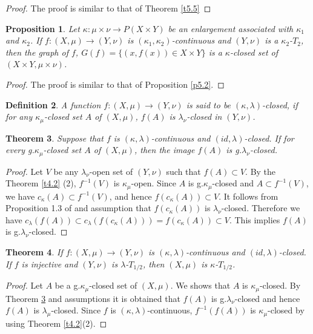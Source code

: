 \documentclass{matua}
\newtheorem{theorem}{Theorem}[section]
\newtheorem{definition}[theorem]{Definition}
\newtheorem{proposition}[theorem]{Proposition}
\begin{document}
\begin{proof}
The proof is similar to that of Theorem \ref{t5.5}
\end{proof}
\begin{proposition}
Let $\kappa:\mu\times \nu\rightarrow P(X\times Y)$ be an enlargement associated with $\kappa_1$ and $\kappa_2$. If $f:(X, \mu)\rightarrow (Y, \nu)$ is $(\kappa_1, \kappa_2)$-continuous and $(Y, \nu)$ is a $\kappa_2$-$T_2$, then the graph of $f$, $G(f)=\{(x, f(x))\in X\times Y\}$ is a $\kappa$-closed set of $(X\times Y, \mu\times \nu)$.
\end{proposition}
\begin{proof}
The proof is similar to that of Proposition \ref{p5.2}.
\end{proof}
\begin{definition}
A function $f: (X, \mu)\rightarrow (Y, \nu)$  is said to be $(\kappa, \lambda)$-closed, if for any $\kappa_\mu$-closed set $A$ of $(X, \mu)$, $f(A)$ is $\lambda_\nu$-closed in $(Y, \nu)$.
\end{definition}

\begin{theorem}\label{t3}
Suppose that $f$ is $(\kappa, \lambda)$-continuous and $(id, \lambda)$-closed.
If for every g.$\kappa_\mu$-closed set $A$ of $(X, \mu)$, then the image $f(A)$ is g.$\lambda_\nu$-closed.
\end{theorem}
\begin{proof}
 Let $V$ be any $\lambda_\nu$-open set of $(Y, \nu)$ such that $f(A)\subset V$. By the Theorem \ref{t4.2} (2), $f^{-1}(V )$ is $\kappa_\mu$-open. Since $A$ is g.$\kappa_\mu$-closed and $A\subset f^{-1}(V )$, we have $c_{\kappa} (A)\subset f^{-1}(V)$, and hence $f(c_\kappa (A))\subset V$. It follows from Proposition 1.3 of \cite{cs3} and assumption that $f(c_\kappa (A))$ is  $\lambda_\nu$-closed. Therefore we have $c_\lambda(f(A))\subset c_\lambda(f(c_\kappa (A))) = f(c_\kappa (A))\subset V$. This implies $f(A)$ is g.$\lambda_\nu$-closed.
\end{proof}
\begin{theorem}
If $f: (X, \mu)\rightarrow (Y, \nu)$  is $(\kappa, \lambda)$-continuous and $(id, \lambda)$-closed. If $f$ is injective and $(Y, \nu)$ is $\lambda$-$T_{1/2}$, then $(X, \mu)$ is $\kappa$-$T_{1/2}$.
\end{theorem}
\begin{proof}
Let $A$ be a g.$\kappa_\mu$-closed set of $(X, \mu)$. We shows that $A$ is $\kappa_\mu$-closed. By Theorem \ref{t3} and assumptions it is obtained that $f(A)$ is g.$\lambda_\nu$-closed and hence $f(A)$ is $\lambda_\mu$-closed. Since $f$ is $(\kappa, \lambda)$-continuous, $f^{-1}(f(A))$ is $\kappa_\mu$-closed by using Theorem \ref{t4.2}(2).
\end{proof}
\end{document}
